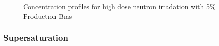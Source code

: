 \documentclass[a4paper]{article}
\begin{document}
\begin{figure}[htb!]
        \caption{Concentration profiles for high dose neutron irradation with 5\% Production Bias}
        \label{figure:concentrations_neutron_5_1e-3}
      \end{figure}

    \newpage
    \subsubsection{Supersaturation} \hspace{10pt}
      \begin{figure}[h!]  %
        \centering
        \qquad

\end{figure}
\end{document}
